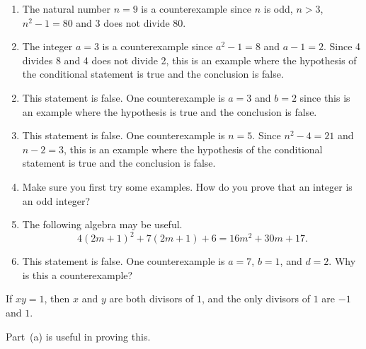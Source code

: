 \begin{list}{\bf{2.}} 
\item \begin{enumerate}
\item The natural number $n = 9$ is a counterexample since $n$ is odd, $n > 3$, $n^2 - 1 = 80$ and 3 does not divide 80.
\addtocounter{enumi}{2}
\item The integer $a = 3$ is a counterexample since $a^2 - 1 = 8$ and $a - 1 = 2$.  Since 4 divides 8 and 4 does not divide 2, this is an example where the hypothesis of the conditional statement is true and the conclusion is false.
\end{enumerate}
\end{list}
 

\begin{list}{\bf{\ref{exer:3truefalse}.}}
\item \begin{enumerate} \setcounter{enumi}{1}
\item This statement is false.  One counterexample is $a = 3$ and $b = 2$ since this is an example where the hypothesis is true and the conclusion is false.
\addtocounter{enumi}{1}
\item This statement is false.  One counterexample is $n = 5$.  Since $n^2 - 4 = 21$ and $n - 2 = 3$, this is an example where the hypothesis of the conditional statement is true and the conclusion is false. 
\item Make sure you first try some examples.  How do you prove that an integer is an odd integer?
\item The following algebra may be useful.
\[
4 \left( 2m + 1 \right)^2 + 7 \left( 2m + 1 \right) + 6 = 16m^2 + 30m + 17. 
\]
\item This statement is false.  One counterexample is $a = 7$, $b = 1$, and $d = 2$.  Why is this a counterexample?
\end{enumerate}
\end{list}



\begin{list}{\bf{\ref{exer:diveach}.}}
\item \begin{list}{\bf{(a)}}  
\item If $xy = 1$, then $x$ and $y$ are both divisors of $1$, and the only divisors of $1$ are $-1$ and $1$.
\end{list}
\end{list}


\begin{list}{}
\item \begin{list}{\bf{(b)}}
\item Part~(a) is useful in proving this.
\end{list}
\end{list}



